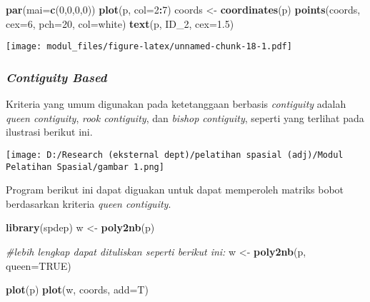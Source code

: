 \documentclass[
]{book}
\newenvironment{Shaded}{\begin{snugshade}}{\end{snugshade}}
\newcommand{\CommentTok}[1]{\textcolor[rgb]{0.56,0.35,0.01}{\textit{#1}}}
\newcommand{\DataTypeTok}[1]{\textcolor[rgb]{0.13,0.29,0.53}{#1}}
\newcommand{\DecValTok}[1]{\textcolor[rgb]{0.00,0.00,0.81}{#1}}
\newcommand{\FloatTok}[1]{\textcolor[rgb]{0.00,0.00,0.81}{#1}}
\newcommand{\KeywordTok}[1]{\textcolor[rgb]{0.13,0.29,0.53}{\textbf{#1}}}
\newcommand{\NormalTok}[1]{#1}
\newcommand{\OperatorTok}[1]{\textcolor[rgb]{0.81,0.36,0.00}{\textbf{#1}}}
\newcommand{\OtherTok}[1]{\textcolor[rgb]{0.56,0.35,0.01}{#1}}
\newcommand{\StringTok}[1]{\textcolor[rgb]{0.31,0.60,0.02}{#1}}
\begin{document}
\begin{Shaded}
\begin{Highlighting}[]
\KeywordTok{par}\NormalTok{(}\DataTypeTok{mai=}\KeywordTok{c}\NormalTok{(}\DecValTok{0}\NormalTok{,}\DecValTok{0}\NormalTok{,}\DecValTok{0}\NormalTok{,}\DecValTok{0}\NormalTok{))}
\KeywordTok{plot}\NormalTok{(p, }\DataTypeTok{col=}\DecValTok{2}\OperatorTok{:}\DecValTok{7}\NormalTok{)}
\NormalTok{coords \textless{}{-}}\StringTok{ }\KeywordTok{coordinates}\NormalTok{(p)}
\KeywordTok{points}\NormalTok{(coords, }\DataTypeTok{cex=}\DecValTok{6}\NormalTok{, }\DataTypeTok{pch=}\DecValTok{20}\NormalTok{, }\DataTypeTok{col=}\StringTok{\textquotesingle{}white\textquotesingle{}}\NormalTok{)}
\KeywordTok{text}\NormalTok{(p, }\StringTok{\textquotesingle{}ID\_2\textquotesingle{}}\NormalTok{, }\DataTypeTok{cex=}\FloatTok{1.5}\NormalTok{)}
\end{Highlighting}
\end{Shaded}

\texttt{[image: modul\_files/figure-latex/unnamed-chunk-18-1.pdf]}

\hypertarget{contiguity-based}{%
\subsubsection{\texorpdfstring{\emph{Contiguity Based}}{Contiguity Based}}\label{contiguity-based}}

Kriteria yang umum digunakan pada ketetanggaan berbasis \emph{contiguity} adalah \emph{queen contiguity}, \emph{rook contiguity}, dan \emph{bishop contiguity}, seperti yang terlihat pada ilustrasi berikut ini.

\texttt{[image: D:/Research (eksternal dept)/pelatihan spasial (adj)/Modul Pelatihan Spasial/gambar 1.png]}

Program berikut ini dapat diguakan untuk dapat memperoleh matriks bobot berdasarkan kriteria \emph{queen contiguity}.

\begin{Shaded}
\begin{Highlighting}[]
\KeywordTok{library}\NormalTok{(spdep)}
\NormalTok{w \textless{}{-}}\StringTok{ }\KeywordTok{poly2nb}\NormalTok{(p)}

\CommentTok{\#lebih lengkap dapat dituliskan seperti berikut ini:}
\NormalTok{w \textless{}{-}}\StringTok{ }\KeywordTok{poly2nb}\NormalTok{(p, }\DataTypeTok{queen=}\OtherTok{TRUE}\NormalTok{)}

\KeywordTok{plot}\NormalTok{(p)}
\KeywordTok{plot}\NormalTok{(w, coords, }\DataTypeTok{add=}\NormalTok{T)}
\end{Highlighting}
\end{Shaded}
\end{document}
